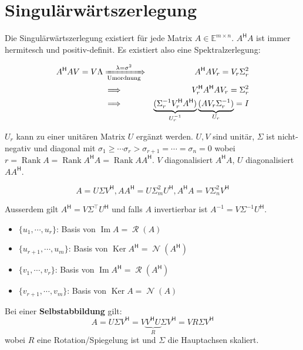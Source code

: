 \documentclass[a4paper,10pt]{article}
\DeclareMathOperator{\Rank}{Rank}
\DeclareMathOperator{\Image}{Im}
\DeclareMathOperator{\Columnspace}{\mathcal{R}}
\DeclareMathOperator{\Nullspace}{\mathcal{N}}
\DeclareMathOperator{\Kernel}{Ker}
\newcommand*{\hermconj}{\mathsf{H}}
\def\E{\mathbb{E}}
\begin{document}
\section{Singulärwärtszerlegung}

Die Singulärwärtszerlegung existiert für jede Matrix $A \in \E^{m \times n}$. $A^\hermconj A$ ist immer hermitesch und positiv-definit. Es existiert also eine Spektralzerlegung:

\begin{align*}
  A^\hermconj A V = V \Lambda & \xRightarrow[\text{Umordnung}]{\lambda = \sigma^2} & A^\hermconj A V_r = V_r \Sigma_r^2\\
  & \implies & V_r^\hermconj A^\hermconj A V_r = \Sigma_r^2\\
  & \implies & \underbrace{(\Sigma_r^{-1} V_r^\hermconj A^\hermconj)}_{U_r^{-1}} \underbrace{(A V_r \Sigma_r^{-1})}_{U_r} = I\\
\end{align*}

$U_r$ kann zu einer unitären Matrix $U$ ergänzt werden. $U, V$ sind unitär, $\Sigma$ ist nicht-negativ und diagonal mit $\sigma_1 \geq \cdots \sigma_r > \sigma_{r+1} = \cdots = \sigma_n = 0$ wobei $r = \Rank A = \Rank A^\hermconj A = \Rank A A^\hermconj$. $V$ diagonalisiert $A^\hermconj A$, $U$ diagonalisiert $A A^\hermconj$.

$$A = U \Sigma V^\hermconj, AA^\hermconj = U \Sigma_m^2 U^\hermconj, A^\hermconj A = V \Sigma_n^2 V^\hermconj$$

Ausserdem gilt $A^\hermconj = V \Sigma^\top U^\hermconj$ und falls $A$ invertierbar ist $A^{-1} = V \Sigma^{-1} U^\hermconj$.

\begin{itemize}
  \item $\{u_1, \cdots, u_r\}$: Basis von $\Image A = \Columnspace(A)$
  \item $\{u_{r+1}, \cdots, u_m\}$: Basis von $\Kernel A^\hermconj = \Nullspace(A^\hermconj)$
  \item $\{v_1, \cdots, v_r\}$: Basis von $\Image A^\hermconj = \Columnspace(A^\hermconj)$
  \item $\{v_{r+1}, \cdots, v_m\}$: Basis von $\Kernel A = \Nullspace(A)$
\end{itemize}

Bei einer \textbf{Selbstabbildung} gilt:
$$A = U \Sigma V^\hermconj = V \underbrace{V^\hermconj U}_R \Sigma V^\hermconj = V R \Sigma V^\hermconj$$
wobei $R$ eine Rotation/Spiegelung ist und $\Sigma$ die Hauptachsen skaliert.
\end{document}
